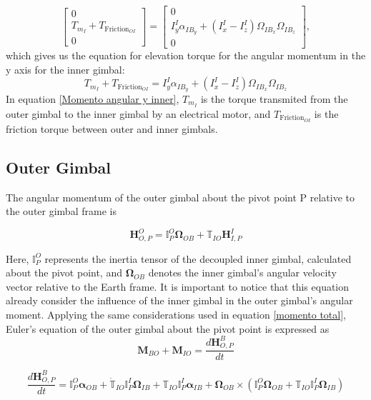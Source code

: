 \begin{equation}
   \left[\begin{matrix} 0 \\ T_{m_I} + T_{\text{Friction}_{OI}} \\ 0\end{matrix}\right] = \left[ \begin{matrix} 0 \\ I^I_y \alpha_{IB_y} + (I^I_x - I^I_z) \Omega_{IB_x} \Omega_{IB_z} \\ 0 \end{matrix}\right],
\end{equation}
which gives us the equation for elevation torque for the angular momentum in the y axis for the inner gimbal:
\begin{equation}
   \label{Momento angular y inner}
   T_{m_I} + T_{\text{Friction}_{OI}} = I^I_y \alpha_{IB_y} + (I^I_x - I^I_z) \Omega_{IB_x} \Omega_{IB_z} 
\end{equation}
In equation \ref{Momento angular y inner}, $T_{m_I}$ is the torque transmited from the outer gimbal to the inner gimbal by an electrical motor, and $T_{\text{Friction}_{OI}}$ is the friction torque between outer and inner gimbals.

\subsection{Outer Gimbal}
The angular momentum of the outer gimbal about the pivot point P relative to the outer gimbal frame is

\begin{equation}
   \mathbf{H}^O_{O,P} = \mathbb{I}^O_P \mathbf{\Omega}_{OB} + \mathbb{T}_{IO} \mathbf{H}^I_{I,P}
\end{equation}

Here, $\mathbb{I}^O_P$ represents the inertia tensor of the decoupled inner gimbal, calculated about the pivot point, and $\mathbf{\Omega}_{OB}$ denotes the inner gimbal's angular velocity vector relative to the Earth frame. It is important to notice that this equation already consider the influence of the inner gimbal in the outer gimbal's angular moment. Applying the same considerations used in equation \ref{momento total}, Euler's equation of the outer gimbal about the pivot point is expressed as
\begin{equation}
\mathbf{M}_{BO} + \mathbf{M}_{IO} = \frac{d\bm{H}^B_{O,P}}{dt}
\end{equation}

\begin{equation}
   \label{momento total outer gimbal}
   \frac{d\bm{H}^B_{O,P}}{dt} = \mathbb{I}^O_P \bm{\alpha}_{OB} + \mathbb{\dot T}_{IO} \mathbb{I}^I_P \bm{\Omega}_{IB} + \mathbb{T}_{IO} \mathbb{I}^I_P \bm{\alpha}_{IB} + \bm{\Omega}_{OB} \times (\mathbb{I}^O_P \bm{\Omega}_{OB} + \mathbb{T}_{IO} \mathbb{I}^I_P \bm{\Omega}_{IB})
\end{equation}

